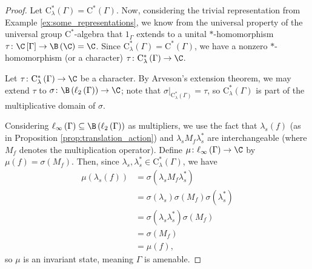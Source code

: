 \begin{proof}
  Let $\mathrm{C}^{\ast}_{\lambda}\left( \Gamma \right) = \mathrm{C}^{\ast}\left( \Gamma \right)$. Now, considering the trivial representation from Example \ref{ex:some_representations}, we know from the universal property of the universal group $\mathrm{C}^{\ast}$-algebra that $1_{\Gamma}$ extends to a unital $\ast$-homomorphism $\tau\colon \C\left[ \Gamma \right]\rightarrow \B\left( \C \right) = \C$. Since $\mathrm{C}^{\ast}_{\lambda}\left( \Gamma \right) = \mathrm{C}^{\ast}\left( \Gamma \right)$, we have a nonzero $\ast$-homomorphism (or a character) $\tau\colon \mathrm{C}^{\ast}_{\lambda}\left( \Gamma \right)\rightarrow \C$.\newline

  Let $\tau\colon \mathrm{C}^{\ast}_{\lambda}\left( \Gamma \right)\rightarrow \C$ be a character. By Arveson's extension theorem, we may extend $\tau$ to $\sigma\colon \B\left( \ell_2\left( \Gamma \right) \right)\rightarrow \C$; note that $\sigma\bigr\vert_{\mathrm{C}^{\ast}_{\lambda}\left( \Gamma \right)} = \tau$, so $\mathrm{C}^{\ast}_{\lambda}\left( \Gamma \right)$ is part of the multiplicative domain of $\sigma$.\newline

  Considering $\ell_{\infty}\left( \Gamma \right)\subseteq \B\left( \ell_2\left( \Gamma \right) \right)$ as multipliers, we use the fact that $\lambda_s(f) $ (as in Proposition \ref{prop:translation_action}) and $\lambda_sM_f\lambda_s^{\ast}$ are interchangeable (where $M_f$ denotes the multiplication operator). Define $\mu\colon \ell_{\infty}\left( \Gamma \right)\rightarrow \C$ by $\mu(f) = \sigma\left( M_f \right)$. Then, since $\lambda_s,\lambda_s^{\ast}\in \mathrm{C}^{\ast}_{\lambda}\left( \Gamma \right)$, we have
  \begin{align*}
    \mu\left( \lambda_s(f) \right) &= \sigma\left( \lambda_sM_f\lambda_s^{\ast} \right)\\
                                   &= \sigma\left( \lambda_s \right)\sigma\left( M_f \right)\sigma\left( \lambda_s^{\ast} \right)\\
                                   &= \sigma\left( \lambda_s\lambda_s^{\ast} \right)\sigma\left( M_f \right)\\
                                   &= \sigma\left( M_f \right)\\
                                   &= \mu\left( f \right),
  \end{align*}
  so $\mu$ is an invariant state, meaning $\Gamma$ is amenable.
\end{proof}

